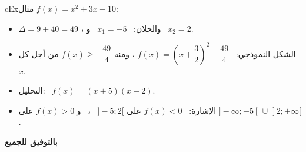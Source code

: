 \documentclass[12pt,a4paper]{article}
\newenvironment{BOX}[2]{\begin{otherlanguage}{english}\begin{arbox}{#1}{#2}}{\end{arbox}\end{otherlanguage}}
\newenvironment{mithal}[1][مثال]{\begin{BOX}{cEx}{#1}}{\end{BOX}}
\begin{document}
\begin{mithal}
$f(x)=x^2+3x-10$:
\begin{itemize}
\item $\Delta=9+40=49$ ، والحلان: \ $x_1=-5$ \ و \ $x_2=2$.
\item الشكل النموذجي: \ $f(x)=\left(x+\dfrac32\right)^2-\dfrac{49}{4}$ ، ومنه $f(x)\ge-\dfrac{49}{4}$ من أجل كل $x$.
\item التحليل: \ $f(x)=(x+5)(x-2)$.
\item الإشارة: \ $f(x)<0$ على $]-5;2[$ \ ، \ و $f(x)>0$ على $]-\infty;-5[\,\cup\,]2;+\infty[$.
\end{itemize}
\end{mithal}

\vfill
\begin{center}
{\color{cSec}\large\bfseries بالتوفيق للجميع}
\end{center}
\end{document}
